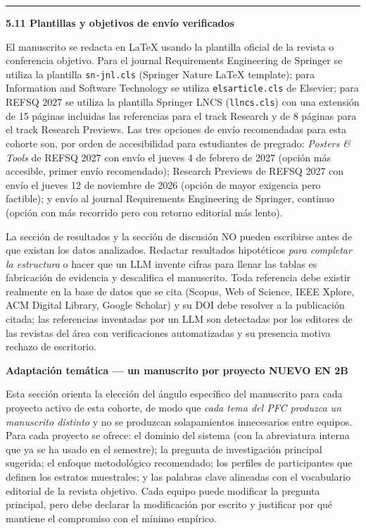 \documentclass[11pt,a4paper]{article}
\newcounter{secc}
\newcommand{\secband}[1]{%
    \stepcounter{secc}\par\vspace{9pt}\noindent
    {\setlength{\fboxsep}{0pt}%
        \colorbox{uteqgold}{\parbox[c][20pt][c]{0.05\textwidth}{\centering\textbf{\color{white}\small \arabic{secc}}}}%
        \colorbox{uteqgreen}{\parbox[c][20pt][c]{0.95\textwidth}{\hspace{8pt}\textbf{\color{white}\small #1}}}%
    }\par\vspace{5pt}}
\newcommand{\submark}[1]{\par\vspace{4pt}\noindent
    {\color{uteqgreen}\rule[-1pt]{3.5pt}{12pt}}\hspace{6pt}\textbf{\color{uteqgreen}#1}\par\vspace{2pt}}
\newcommand{\bF}{{\setlength{\fboxsep}{1.5pt}\colorbox{crimsonfin}{\scriptsize\bfseries\color{white}NUEVO EN 2B}}}
\begin{document}
\submark{5.11 Plantillas y objetivos de envío verificados}
El manuscrito se redacta en LaTeX usando la plantilla oficial de la revista o conferencia objetivo.
Para el journal Requirements Engineering de Springer se utiliza la plantilla \texttt{sn-jnl.cls} (Springer Nature LaTeX template); para Information and Software Technology se utiliza \texttt{elsarticle.cls} de Elsevier; para REFSQ 2027 se utiliza la plantilla Springer LNCS (\texttt{llncs.cls}) con una extensión de 15 páginas incluidas las referencias para el track Research y de 8 páginas para el track Research Previews.
Las tres opciones de envío recomendadas para esta cohorte son, por orden de accesibilidad para estudiantes de pregrado: \emph{Posters \& Tools} de REFSQ 2027 con envío el jueves 4 de febrero de 2027 (opción más accesible, primer envío recomendado); Research Previews de REFSQ 2027 con envío el jueves 12 de noviembre de 2026 (opción de mayor exigencia pero factible); y envío al journal Requirements Engineering de Springer, continuo (opción con más recorrido pero con retorno editorial más lento).

\begin{alertbox}[title=Advertencia específica sobre integridad del manuscrito]
    La sección de resultados y la sección de discusión NO pueden escribirse antes de que existan los datos analizados.
    Redactar resultados hipotéticos \emph{para completar la estructura} o hacer que un LLM invente cifras para llenar las tablas es fabricación de evidencia y descalifica el manuscrito.
    Toda referencia debe existir realmente en la base de datos que se cita (Scopus, Web of Science, IEEE Xplore, ACM Digital Library, Google Scholar) y su DOI debe resolver a la publicación citada; las referencias inventadas por un LLM son detectadas por los editores de las revistas del área con verificaciones automatizadas y su presencia motiva rechazo de escritorio.
\end{alertbox}
\secband{Adaptación temática --- un manuscrito por proyecto \bF}

Esta sección orienta la elección del ángulo específico del manuscrito para cada proyecto activo de esta cohorte, de modo que \emph{cada tema del PFC produzca un manuscrito distinto} y no se produzcan solapamientos innecesarios entre equipos.
Para cada proyecto se ofrece: el dominio del sistema (con la abreviatura interna que ya se ha usado en el semestre); la pregunta de investigación principal sugerida; el enfoque metodológico recomendado; los perfiles de participantes que definen los estratos muestrales; y las palabras clave alineadas con el vocabulario editorial de la revista objetivo.
Cada equipo puede modificar la pregunta principal, pero debe declarar la modificación por escrito y justificar por qué mantiene el compromiso con el mínimo empírico.
\end{document}
